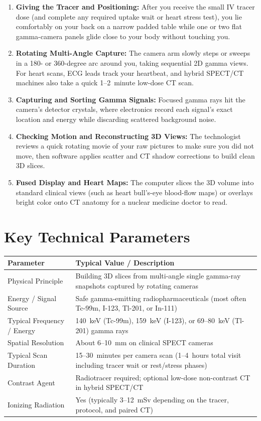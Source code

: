 \begin{enumerate}
    \item \textbf{Giving the Tracer and Positioning:} After you receive the small IV tracer dose (and complete any required uptake wait or heart stress test), you lie comfortably on your back on a narrow padded table while one or two flat gamma-camera panels glide close to your body without touching you.
    \item \textbf{Rotating Multi-Angle Capture:} The camera arm slowly steps or sweeps in a 180- or 360-degree arc around you, taking sequential 2D gamma views. For heart scans, ECG leads track your heartbeat, and hybrid SPECT/CT machines also take a quick 1--2~minute low-dose CT scan.
    \item \textbf{Capturing and Sorting Gamma Signals:} Focused gamma rays hit the camera's detector crystals, where electronics record each signal's exact location and energy while discarding scattered background noise.
    \item \textbf{Checking Motion and Reconstructing 3D Views:} The technologist reviews a quick rotating movie of your raw pictures to make sure you did not move, then software applies scatter and CT shadow corrections to build clean 3D slices.
    \item \textbf{Fused Display and Heart Maps:} The computer slices the 3D volume into standard clinical views (such as heart bull's-eye blood-flow maps) or overlays bright color onto CT anatomy for a nuclear medicine doctor to read.
\end{enumerate}

\section{Key Technical Parameters}

\noindent
\begin{tabularx}{\textwidth}{@{}l X@{}}
\toprule
\textbf{Parameter} & \textbf{Typical Value / Description} \\
\midrule
Physical Principle & Building 3D slices from multi-angle single gamma-ray snapshots captured by rotating cameras \\
Energy / Signal Source & Safe gamma-emitting radiopharmaceuticals (most often Tc-99m, I-123, Tl-201, or In-111) \\
Typical Frequency / Energy & 140~keV (Tc-99m), 159~keV (I-123), or 69--80~keV (Tl-201) gamma rays \\
Spatial Resolution & About 6--10~mm on clinical SPECT cameras \\
Typical Scan Duration & 15--30~minutes per camera scan (1--4~hours total visit including tracer wait or rest/stress phases) \\
Contrast Agent & Radiotracer required; optional low-dose non-contrast CT in hybrid SPECT/CT \\
Ionizing Radiation & Yes (typically 3--12~mSv depending on the tracer, protocol, and paired CT) \\
\bottomrule
\end{tabularx}

